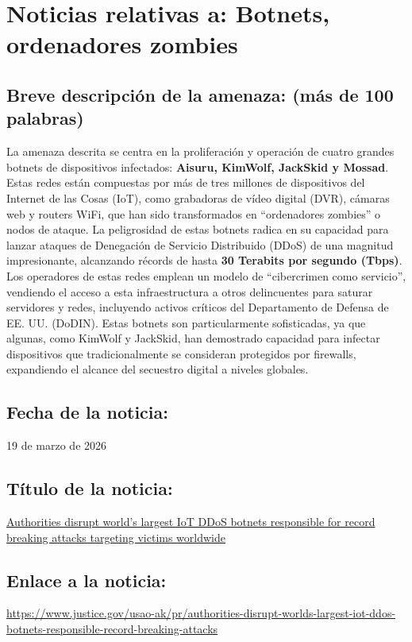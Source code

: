 \chapter{Noticias relativas a: Botnets, ordenadores zombies}

    \section{Breve descripción de la amenaza: (más de 100 palabras)}
    La amenaza descrita se centra en la proliferación y operación de cuatro grandes botnets de dispositivos infectados: 
    \textbf{Aisuru, KimWolf, JackSkid y Mossad}. Estas redes están compuestas por más de tres millones de dispositivos del Internet
     de las Cosas (IoT), como grabadoras de vídeo digital (DVR), cámaras web y routers WiFi, que han sido transformados en 
     ``ordenadores zombies'' o nodos de ataque. La peligrosidad de estas botnets radica en su capacidad para lanzar ataques 
     de Denegación de Servicio Distribuido (DDoS) de una magnitud impresionante, alcanzando récords de hasta 
     \textbf{30 Terabits por segundo (Tbps)}. Los operadores de estas redes emplean un modelo de ``cibercrimen como servicio'',
      vendiendo el acceso a esta infraestructura a otros delincuentes para saturar servidores y redes, incluyendo activos 
      críticos del Departamento de Defensa de EE. UU. (DoDIN). Estas botnets son particularmente sofisticadas, ya que algunas, 
      como KimWolf y JackSkid, han demostrado capacidad para infectar dispositivos que tradicionalmente se consideran protegidos 
      por firewalls, expandiendo el alcance del secuestro digital a niveles globales.

    \section{Fecha de la noticia:}
    19 de marzo de 2026
   
    \section{Título de la noticia:}
    \href{https://www.justice.gov/usao-ak/pr/authorities-disrupt-worlds-largest-iot-ddos-botnets-responsible-record-breaking-attacks}{Authorities disrupt world’s largest IoT DDoS botnets responsible for record breaking attacks targeting victims worldwide}

    \section{Enlace a la noticia:}
    \href{https://www.justice.gov/usao-ak/pr/authorities-disrupt-worlds-largest-iot-ddos-botnets-responsible-record-breaking-attacks}{https://www.justice.gov/usao-ak/pr/authorities-disrupt-worlds-largest-iot-ddos-botnets-responsible-record-breaking-attacks}

